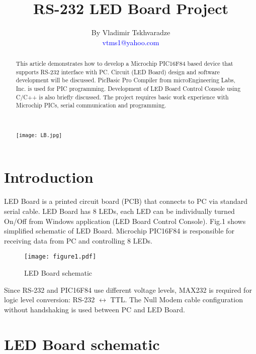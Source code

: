 \documentclass{article}
\begin{document}
\title{RS-232 LED Board Project}
\author{By Vladimir Tskhvaradze \\ \textcolor{blue}{\small{vtms1@yahoo.com}}}
\maketitle

\begin{abstract}
This article demonstrates how to develop a Microchip PIC16F84 based
device that supports RS-232 interface with PC. Circuit (LED Board)
design and software development will be discussed. PicBasic Pro
Compiler from microEngineering Labs, Inc. is used for PIC
programming. Development of LED Board Control Console using C/C++ is
also briefly discussed. The project requires basic work experience
with Microchip PICs, serial communication and programming.
\\
\\
\\
\begin{center}
\texttt{[image: LB.jpg]}
\end{center}
\end{abstract}

\thispagestyle{empty}

\newpage

\section{Introduction}

LED Board is a printed circuit board (PCB) that connects to PC via
standard serial cable. LED Board has 8 LEDs, each LED can be
individually turned On/Off from Windows application (LED Board
Control Console). Fig.1 shows simplified schematic of LED Board.
Microchip PIC16F84 is responsible for receiving data from PC and
controlling 8 LEDs.

\makeatletter
\def\fps@figure{h}
\makeatother

\begin{figure}
\centering
\texttt{[image: figure1.pdf]}
\caption{LED Board schematic} \label{fig:graph}
\end{figure}
Since RS-232 and PIC16F84 use different voltage levels, MAX232 is
required for logic level conversion: RS-232 $\longleftrightarrow$
TTL. The Null Modem cable configuration without handshaking is used
between PC and LED Board.

\newpage
\section{LED Board schematic}
\end{document}
